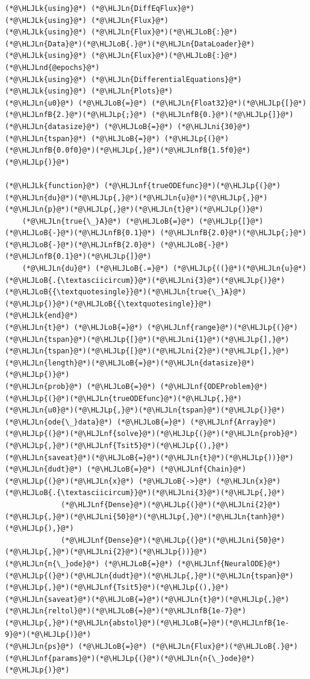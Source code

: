 \documentclass[12pt,a4paper]{article}
\newcommand{\HLJLk}[1]{\textcolor[RGB]{148,91,176}{\textbf{#1}}}
\newcommand{\HLJLn}[1]{#1}
\newcommand{\HLJLnd}[1]{\textcolor[RGB]{214,102,97}{#1}}
\newcommand{\HLJLnf}[1]{\textcolor[RGB]{66,102,213}{#1}}
\newcommand{\HLJLnfB}[1]{\textcolor[RGB]{59,151,46}{#1}}
\newcommand{\HLJLni}[1]{\textcolor[RGB]{59,151,46}{#1}}
\newcommand{\HLJLoB}[1]{\textcolor[RGB]{102,102,102}{\textbf{#1}}}
\newcommand{\HLJLp}[1]{#1}
\begin{document}
\begin{lstlisting}
(*@\HLJLk{using}@*) (*@\HLJLn{DiffEqFlux}@*)
(*@\HLJLk{using}@*) (*@\HLJLn{Flux}@*)
(*@\HLJLk{using}@*) (*@\HLJLn{Flux}@*)(*@\HLJLoB{:}@*) (*@\HLJLn{Data}@*)(*@\HLJLoB{.}@*)(*@\HLJLn{DataLoader}@*)
(*@\HLJLk{using}@*) (*@\HLJLn{Flux}@*)(*@\HLJLoB{:}@*) (*@\HLJLnd{@epochs}@*)
(*@\HLJLk{using}@*) (*@\HLJLn{DifferentialEquations}@*)
(*@\HLJLk{using}@*) (*@\HLJLn{Plots}@*)
(*@\HLJLn{u0}@*) (*@\HLJLoB{=}@*) (*@\HLJLn{Float32}@*)(*@\HLJLp{[}@*)(*@\HLJLnfB{2.}@*)(*@\HLJLp{;}@*) (*@\HLJLnfB{0.}@*)(*@\HLJLp{]}@*)
(*@\HLJLn{datasize}@*) (*@\HLJLoB{=}@*) (*@\HLJLni{30}@*)
(*@\HLJLn{tspan}@*) (*@\HLJLoB{=}@*) (*@\HLJLp{(}@*)(*@\HLJLnfB{0.0f0}@*)(*@\HLJLp{,}@*)(*@\HLJLnfB{1.5f0}@*)(*@\HLJLp{)}@*)

(*@\HLJLk{function}@*) (*@\HLJLnf{trueODEfunc}@*)(*@\HLJLp{(}@*)(*@\HLJLn{du}@*)(*@\HLJLp{,}@*)(*@\HLJLn{u}@*)(*@\HLJLp{,}@*)(*@\HLJLn{p}@*)(*@\HLJLp{,}@*)(*@\HLJLn{t}@*)(*@\HLJLp{)}@*)
    (*@\HLJLn{true{\_}A}@*) (*@\HLJLoB{=}@*) (*@\HLJLp{[}@*)(*@\HLJLoB{-}@*)(*@\HLJLnfB{0.1}@*) (*@\HLJLnfB{2.0}@*)(*@\HLJLp{;}@*) (*@\HLJLoB{-}@*)(*@\HLJLnfB{2.0}@*) (*@\HLJLoB{-}@*)(*@\HLJLnfB{0.1}@*)(*@\HLJLp{]}@*)
    (*@\HLJLn{du}@*) (*@\HLJLoB{.=}@*) (*@\HLJLp{((}@*)(*@\HLJLn{u}@*)(*@\HLJLoB{.{\textasciicircum}}@*)(*@\HLJLni{3}@*)(*@\HLJLp{)}@*)(*@\HLJLoB{{\textquotesingle}}@*)(*@\HLJLn{true{\_}A}@*)(*@\HLJLp{)}@*)(*@\HLJLoB{{\textquotesingle}}@*)
(*@\HLJLk{end}@*)
(*@\HLJLn{t}@*) (*@\HLJLoB{=}@*) (*@\HLJLnf{range}@*)(*@\HLJLp{(}@*)(*@\HLJLn{tspan}@*)(*@\HLJLp{[}@*)(*@\HLJLni{1}@*)(*@\HLJLp{],}@*)(*@\HLJLn{tspan}@*)(*@\HLJLp{[}@*)(*@\HLJLni{2}@*)(*@\HLJLp{],}@*)(*@\HLJLn{length}@*)(*@\HLJLoB{=}@*)(*@\HLJLn{datasize}@*)(*@\HLJLp{)}@*)
(*@\HLJLn{prob}@*) (*@\HLJLoB{=}@*) (*@\HLJLnf{ODEProblem}@*)(*@\HLJLp{(}@*)(*@\HLJLn{trueODEfunc}@*)(*@\HLJLp{,}@*)(*@\HLJLn{u0}@*)(*@\HLJLp{,}@*)(*@\HLJLn{tspan}@*)(*@\HLJLp{)}@*)
(*@\HLJLn{ode{\_}data}@*) (*@\HLJLoB{=}@*) (*@\HLJLnf{Array}@*)(*@\HLJLp{(}@*)(*@\HLJLnf{solve}@*)(*@\HLJLp{(}@*)(*@\HLJLn{prob}@*)(*@\HLJLp{,}@*)(*@\HLJLnf{Tsit5}@*)(*@\HLJLp{(),}@*)(*@\HLJLn{saveat}@*)(*@\HLJLoB{=}@*)(*@\HLJLn{t}@*)(*@\HLJLp{))}@*)
(*@\HLJLn{dudt}@*) (*@\HLJLoB{=}@*) (*@\HLJLnf{Chain}@*)(*@\HLJLp{(}@*)(*@\HLJLn{x}@*) (*@\HLJLoB{->}@*) (*@\HLJLn{x}@*)(*@\HLJLoB{.{\textasciicircum}}@*)(*@\HLJLni{3}@*)(*@\HLJLp{,}@*)
             (*@\HLJLnf{Dense}@*)(*@\HLJLp{(}@*)(*@\HLJLni{2}@*)(*@\HLJLp{,}@*)(*@\HLJLni{50}@*)(*@\HLJLp{,}@*)(*@\HLJLn{tanh}@*)(*@\HLJLp{),}@*)
             (*@\HLJLnf{Dense}@*)(*@\HLJLp{(}@*)(*@\HLJLni{50}@*)(*@\HLJLp{,}@*)(*@\HLJLni{2}@*)(*@\HLJLp{))}@*)
(*@\HLJLn{n{\_}ode}@*) (*@\HLJLoB{=}@*) (*@\HLJLnf{NeuralODE}@*)(*@\HLJLp{(}@*)(*@\HLJLn{dudt}@*)(*@\HLJLp{,}@*)(*@\HLJLn{tspan}@*)(*@\HLJLp{,}@*)(*@\HLJLnf{Tsit5}@*)(*@\HLJLp{(),}@*)(*@\HLJLn{saveat}@*)(*@\HLJLoB{=}@*)(*@\HLJLn{t}@*)(*@\HLJLp{,}@*)(*@\HLJLn{reltol}@*)(*@\HLJLoB{=}@*)(*@\HLJLnfB{1e-7}@*)(*@\HLJLp{,}@*)(*@\HLJLn{abstol}@*)(*@\HLJLoB{=}@*)(*@\HLJLnfB{1e-9}@*)(*@\HLJLp{)}@*)
(*@\HLJLn{ps}@*) (*@\HLJLoB{=}@*) (*@\HLJLn{Flux}@*)(*@\HLJLoB{.}@*)(*@\HLJLnf{params}@*)(*@\HLJLp{(}@*)(*@\HLJLn{n{\_}ode}@*)(*@\HLJLp{)}@*)
\end{lstlisting}
\end{document}
